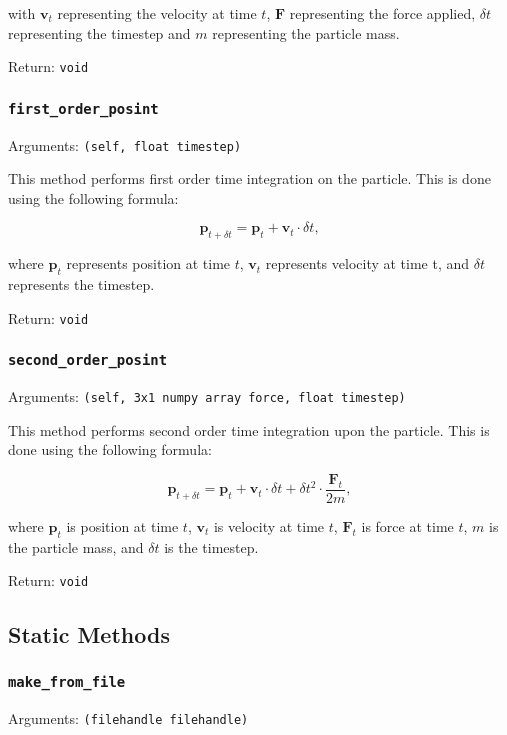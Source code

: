 \documentclass[a4paper, 11pt, british, left=1in, right=1in, top=0.3in, bottom=1in]{article}
\begin{document}
	with $\textbf{v}_t$ representing the velocity at time $t$, $\textbf{F}$ representing the force applied, $\delta t$ representing the timestep and $m$ representing the particle mass. 
	
	Return: \texttt{void}
	
	\subsubsection{\texttt{first\_order\_posint}}
	
	Arguments: \texttt{(self, float timestep)}
	
	This method performs first order time integration on the particle. This is done using the following formula:
	
	$$\textbf{p}_{t+\delta t} = \textbf{p}_t + \textbf{v}_t \cdot \delta t, $$
	
	where $\textbf{p}_t$ represents position at time $t$, $\textbf{v}_t$ represents velocity at time t, and $\delta t$ represents the timestep. 
	
	Return: \texttt{void}	
	
	\subsubsection{\texttt{second\_order\_posint}}
	
	Arguments: \texttt{(self, 3x1 numpy array force, float timestep)}
	
	This method performs second order time integration upon the particle. This is done using the following formula: 
	
	$$\textbf{p}_{t+\delta t} = \textbf{p}_t + \textbf{v}_t\cdot\delta t + \delta t^2 \cdot \frac{\textbf{F}_t}{2m},$$
	
	where $\textbf{p}_t$ is position at time $t$, $\textbf{v}_t$ is velocity at time $t$, $\textbf{F}_t$ is force at time $t$, $m$ is the particle mass, and $\delta t$ is the timestep. 
	
	Return: \texttt{void}

	\subsection{Static Methods}
	
	\subsubsection{\texttt{make\_from\_file}}
	
	Arguments: \texttt{(filehandle filehandle)}
	
\end{document}
